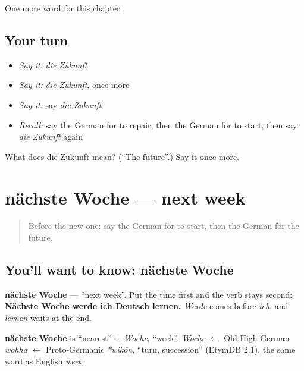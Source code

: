 \begin{grammarlens}[title={What you've built}]
One more word for this chapter.
\end{grammarlens}

\subsection*{Your turn}
\begin{itemize}
\raggedright
  \item \emph{Say it:} \emph{die Zukunft}
  \item \emph{Say it:} \emph{die Zukunft}, once more
  \item \emph{Say it:} say \emph{die Zukunft}
  \item \emph{Recall:} say the German for to repair, then the German for to start, then say \emph{die Zukunft} again
\end{itemize}

\begin{tcolorbox}[breakable,colback=teal!4,colframe=teal!35!black,title={Before you move on}]
What does die Zukunft mean? (\textquotedblleft{}The future\textquotedblright{}.) Say it once more.
\end{tcolorbox}
\section[nächste Woche]{nächste Woche — next week}

\label{lesson:GE-C142-naechste-woche}



\begin{quote}
Before the new one: say the German for to start, then the German for the future.
\end{quote}

\subsection*{You'll want to know: nächste Woche}
\textbf{nächste Woche} — \textquotedblleft{}next week\textquotedblright{}. Put the time first and the verb stays second: \textbf{Nächste Woche werde ich Deutsch lernen.} \emph{Werde} comes before \emph{ich}, and \emph{lernen} waits at the end.

\begin{cousinweb}
\textbf{nächste Woche} is \textquotedblleft{}nearest\textquotedblright{} + \emph{Woche}, \textquotedblleft{}week\textquotedblright{}. \emph{Woche} $\leftarrow$ Old High German \emph{wohha} $\leftarrow$ Proto-Germanic \emph{*wikōn}, \textquotedblleft{}turn, succession\textquotedblright{} (EtymDB 2.1), the same word as English \emph{week}.
\end{cousinweb}

